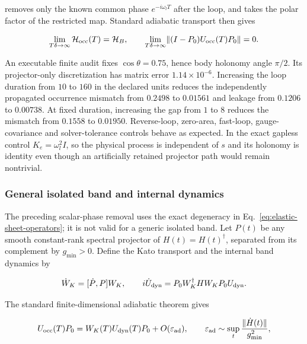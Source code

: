 \documentclass[11pt]{article}
\begin{document}
removes only the known common phase \(e^{-i\omega_lT}\) after the loop, and
takes the polar factor of the restricted map.  Standard adiabatic transport
then gives

\begin{equation}
 \lim_{T\delta\to\infty}\mathcal H_{\rm occ}(T)=\mathcal H_B,
 \qquad
 \lim_{T\delta\to\infty}
 \lVert(I-P_0)U_{\rm occ}(T)P_0\rVert=0.
 \label{eq:elastic-sheet-adiabatic-limit}
\end{equation}

An executable finite audit fixes \(\cos\theta=0.75\), hence body holonomy
angle \(\pi/2\).  Its projector-only discretization has matrix error
\(1.14\times10^{-6}\).  Increasing the loop duration from \(10\) to \(160\)
in the declared units reduces the independently propagated occurrence
mismatch from \(0.2498\) to \(0.01561\) and leakage from \(0.1206\) to
\(0.00738\).  At fixed duration, increasing the gap from \(1\) to \(8\)
reduces the mismatch from \(0.1558\) to \(0.01950\).  Reverse-loop,
zero-area, fast-loop, gauge-covariance and solver-tolerance controls behave as
expected.  In the exact gapless control \(K_e=\omega_l^2I\), so the physical
process is independent of \(s\) and its holonomy is identity even though an
artificially retained projector path would remain nontrivial.

\subsubsection{General isolated band and internal dynamics}

The preceding scalar-phase removal uses the exact degeneracy in
Eq.~\eqref{eq:elastic-sheet-operators}; it is not valid for a generic isolated
band. Let \(P(t)\) be any smooth constant-rank spectral projector of
\(H(t)=H(t)^\dagger\), separated from its complement by
\(g_{\min}>0\). Define the Kato transport and the internal band dynamics by

\begin{equation}
 \dot W_K=[\dot P,P]W_K,\qquad
 i\dot U_{\rm dyn}
 =P_0W_K^\dagger H W_KP_0U_{\rm dyn}.
 \label{eq:elastic-sheet-kato-internal}
\end{equation}

The standard finite-dimensional adiabatic theorem gives

\begin{equation}
 U_{\rm occ}(T)P_0
 =W_K(T)U_{\rm dyn}(T)P_0+O(\varepsilon_{\rm ad}),
 \qquad
 \varepsilon_{\rm ad}\sim
 \sup_t\frac{\|\dot H(t)\|}{g_{\min}^2},
 \label{eq:elastic-sheet-factorization}
\end{equation}
\end{document}
